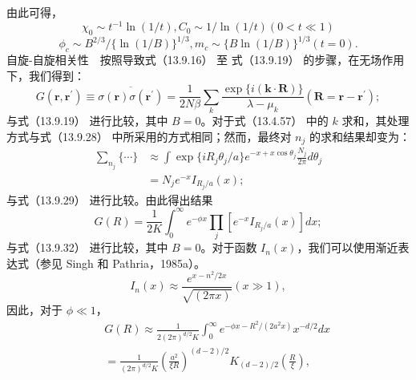 由此可得，
\begin{equation}\tag{13.4.88}\label{eq:13.4.88}
\chi _ { 0 } \sim t ^{- 1} \ln ( 1 / t ) ,  C _ { 0 } \sim 1 / \ln ( 1 / t )  ( 0 < t \ll 1 )
\end{equation}
\begin{equation}\tag{13.4.89}\label{eq:13.4.89}
\phi _ { c } \sim B ^{2 / 3} / \{ \ln ( 1 / B ) \} ^{1 / 3} ,  m _ { c } \sim \{ B \ln ( 1 / B ) \} ^{1 / 3}  ( t = 0 ) .
\end{equation}
自旋-自旋相关性　按照导致式（13.9.16） 至 式（13.9.19） 的步骤，在无场作用下，我们得到：
\begin{equation}\tag{13.4.90}\label{eq:13.4.90}
G ( \pmb { r } , \pmb { r } ^{\prime} ) \equiv \overline { { \sigma \left( \pmb { r } \right) \sigma \left( \pmb { r } ^{\prime} \right) } } = \frac { 1 } { 2 N \beta } \sum _ { k } \frac { \exp \{ i ( \pmb { k } \cdot \pmb { R } ) \} } { \lambda - \mu _ { k } }  ( \pmb { R } = \pmb { r } - \pmb { r } ^{\prime} ) ;
\end{equation}
与式（13.9.19） 进行比较，其中 \(B=0\)。对于式（13.4.57） 中的 \(k\) 求和，其处理方式与式（13.9.28） 中所采用的方式相同；然而，最终对 \(n_j\) 的求和结果却变为：
\begin{equation}\tag{13.4.91}\label{eq:13.4.91}
\begin{aligned}\sum_{n_j}\{\cdots\}&\approx\int\exp\{iR_j\theta_j/a\}e^{-x+x\cos\theta_j}\frac{N_j}{2\pi}d\theta_j\\&=N_je^{-x}I_{R_j/a}(x);\end{aligned}
\end{equation}
与式（13.9.29） 进行比较。由此得出结果
\begin{equation}\tag{13.4.92}\label{eq:13.4.92}
G ( R ) = \frac { 1 } { 2 K } \int _ { 0 } ^{\infty} e ^{- \phi x} \prod _ { j } [ e ^{- x} I _ { R _ { j } / a } ( x ) ] d x ;
\end{equation}
与式（13.9.32） 进行比较，其中 \(B=0\)。对于函数 \(I_{n}(x)\)，我们可以使用渐近表达式（参见 Singh 和 Pathria，1985a）。
\begin{equation}\tag{13.4.93}\label{eq:13.4.93}
I _ { n } ( x ) \approx \frac { e ^{x - n ^ { 2} / 2 x } } { \sqrt { ( 2 \pi x ) } }  ( x \gg 1 ) ,
\end{equation}
因此，对于 \(\phi \ll 1\)，
\begin{equation}\tag{13.4.94}\label{eq:13.4.94}
\begin{array}{rlr} & { } & { G ( R ) \approx \frac { 1 } { 2 ( 2 \pi ) ^{d / 2} K } \int _ { 0 } ^{\infty} e ^{- \phi x - R ^ { 2} / ( 2 a ^{2} x ) } x ^{- d / 2} d x } \\& { } & { = \frac { 1 } { ( 2 \pi ) ^{d / 2} K } \left( \frac { a ^{2} } { \xi R } \right) ^{( d - 2 ) / 2} K _ { ( d - 2 ) / 2 } \left( \frac { R } { \xi } \right) , } \end{array}
\end{equation}
